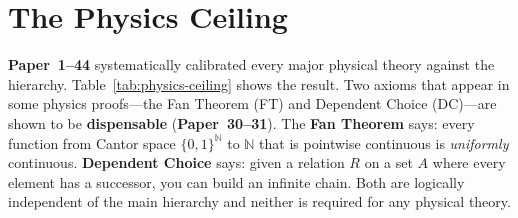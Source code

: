 \documentclass[11pt,twoside,openany]{report}
\theoremstyle{remark}
\newcommand{\DC}{\textsf{DC}}
\newcommand{\FT}{\textsf{FT}}
\newcommand{\paperref}[1]{\textbf{Paper~#1}}
\begin{document}
\section{The Physics Ceiling}

\paperref{1--44} systematically calibrated every major physical theory against the hierarchy. Table~\ref{tab:physics-ceiling} shows the result. Two axioms that appear in some physics proofs---the Fan Theorem (\FT) and Dependent Choice (\DC)---are shown to be \textbf{dispensable} (\paperref{30--31}). The \textbf{Fan Theorem} says: every function from Cantor space $\{0,1\}^\mathbb{N}$ to $\mathbb{N}$ that is pointwise continuous is \emph{uniformly} continuous. \textbf{Dependent Choice} says: given a relation $R$ on a set $A$ where every element has a successor, you can build an infinite chain. Both are logically independent of the main hierarchy and neither is required for any physical theory.
\end{document}
